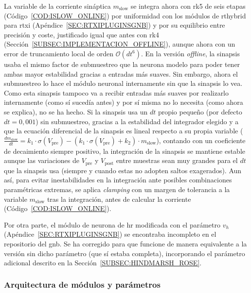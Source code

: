 La variable de la corriente sináptica \(m_{\mathrm{slow}}\) se integra ahora con \ac{rk5} de seis etapas (Código~\ref{COD:ISLOW_ONLINE}) por uniformidad con los módulos de \ac{rthybrid} \cite{Amaducci2019} para \ac{rtxi} (Apéndice~\ref{SEC:RTXIPLUGINSGNB}) y por su equilibrio entre precisión y coste, justificado igual que antes con \ac{rk4} (Sección~\ref{SUBSEC:IMPLEMENTACION_OFFLINE}), aunque ahora con un error de truncamiento local de orden $\mathcal{O}(dt^6)$. En la versión \textit{offline}, la sinapsis usaba el mismo factor de submuestreo que la neurona modelo para poder tener ambas mayor estabilidad gracias a entradas más suaves. Sin embargo, ahora el submuestreo lo hace el módulo neuronal internamente sin que la sinapsis lo vea. Como esta sinapsis tampoco va a recibir entradas más suaves por realizarlo internamente (como sí sucedía antes) y por sí misma no lo necesita (como ahora se explica), no se ha hecho. Si la sinapsis usa un \(dt\) propio pequeño (por defecto $dt = 0{,}001$) sin submuestreo, gracias a la estabilidad del integrador elegido y a que la ecuación diferencial de la sinapsis es lineal respecto a su propia variable (\( \frac{d m_{\mathrm{slow}}}{dt} = k_1 \cdot \sigma(V_{\mathrm{pre}}) - (k_1 \cdot \sigma(V_{\mathrm{pre}}) + k_2) \cdot m_{\mathrm{slow}} \)), contando con un coeficiente de decaimiento siempre positivo, la integración de la sinapsis se mantiene estable aunque las variaciones de \(V_{\mathrm{pre}}\) y \(V_{\mathrm{post}}\) entre muestras sean muy grandes para el $dt$ que la sinapsis usa (siempre y cuando estas no adopten saltos exagerados). Aun así, para evitar inestabilidades en la integración ante posibles combinaciones paramétricas extremas, se aplica \textit{clamping} con un margen de tolerancia a la variable $m_{\mathrm{slow}}$ tras la integración, antes de calcular la corriente (Código~\ref{COD:ISLOW_ONLINE}).

Por otra parte, el módulo de neurona de \ac{hr} modificada con el parámetro \(v_h\) (Apéndice~\ref{SEC:RTXIPLUGINSGNB}) se encontraba incompleto en el repositorio del \ac{gnb}. Se ha corregido para que funcione de manera equivalente a la versión sin dicho parámetro (que sí estaba completa), incorporando el parámetro adicional descrito en la Sección~\ref{SUBSEC:HINDMARSH_ROSE}.

\subsubsection{Arquitectura de módulos y parámetros\label{SUBSUBSEC:ARQUITECTURA_MODULOS}}

